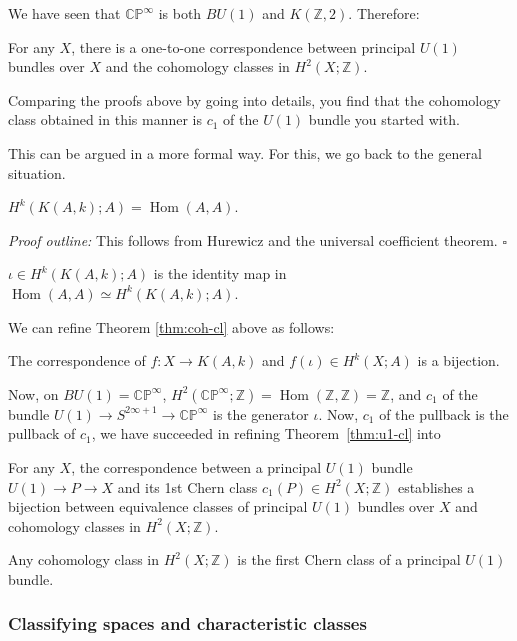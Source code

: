 \documentclass[12pt]{article}
\numberwithin{equation}{section}
\numberwithin{figure}{section}
\theoremstyle{remark}
\renewenvironment{proof}{\noindent\textsl{Proof outline:}}{\hfill$\square$}
\def\bZ{\mathbb{Z}}
\def\CP{\mathbb{CP}}
\def\Hom{\mathop{\mathrm{Hom}}}
\begin{document}
We have seen that $\CP^\infty$ is both $BU(1)$ and $K(\bZ,2)$.
Therefore:
\begin{theorem}
\label{thm:u1-cl}
For any $X$, there is a one-to-one correspondence between principal $U(1)$ bundles over $X$
and the cohomology classes in $H^2(X;\bZ)$.
\end{theorem}
Comparing the proofs above by going into details, 
you find that the cohomology class obtained in this manner is 
$c_1$ of the $U(1)$ bundle you started with.

This can be argued in a more formal way.
For this, we go back to the general situation.
\begin{proposition}
$H^k(K(A,k);A)=\Hom(A,A)$.
\end{proposition}
\begin{proof}
This follows from Hurewicz and the universal coefficient theorem.
\end{proof}

\begin{definition}
$\iota \in H^k(K(A,k);A)$ is the identity map in $\Hom(A,A)\simeq H^k(K(A,k);A)$.
\end{definition}

We can refine Theorem \ref{thm:coh-cl} above as follows:
\begin{theorem}
The correspondence of $f: X\to K(A,k)$  and $f(\iota)\in H^k(X;A)$ is a bijection.
\end{theorem}

Now, on $BU(1)=\CP^\infty$, $H^2(\CP^\infty;\bZ)=\Hom(\bZ,\bZ)=\bZ$,
and $c_1$ of the bundle $U(1)\to S^{2\infty+1}\to \CP^\infty$ is the generator $\iota$.
Now, $c_1$ of the pullback is the pullback of $c_1$, we have succeeded in refining Theorem~\ref{thm:u1-cl} into
\begin{theorem}
For any $X$,
the correspondence between  a principal $U(1)$ bundle $U(1)\to P\to X$
and its 1st Chern class $c_1(P)\in H^2(X;\bZ)$ 
establishes a bijection between equivalence classes of principal $U(1)$ bundles over $X$
and cohomology classes in $H^2(X;\bZ)$.
\end{theorem}

\begin{corollary}
Any cohomology class  in $H^2(X;\bZ)$ is the first Chern class of a principal $U(1)$ bundle.
\end{corollary}

\subsubsection{Classifying spaces and characteristic classes}
\end{document}
